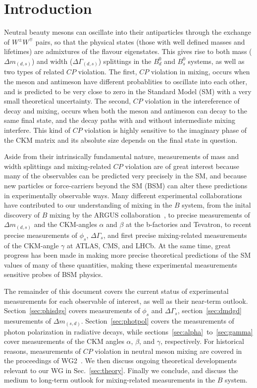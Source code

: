 \section{Introduction}
Neutral beauty mesons can oscillate into their antiparticles through the exchange of $W^\pm W^\mp$ pairs, so that the 
physical states (those with well defined masses and lifetimes) are admixtures of the flavour eigenstates. This gives
rise to both mass ($\Delta m_{(d,s)}$) and width ($\Delta\Gamma_{(d,s)}$) splittings in the $B^0_d$ and $B^0_s$ systems, as well
as two types of related $CP$ violation. The first, $CP$ violation in mixing, occurs when the meson and antimeson have different
probablities to oscillate into each other, and is predicted to be very close to zero in the Standard Model (SM) with a very
small theoretical uncertainty. The second, $CP$ violation in the intereference of decay and mixing, occurs when both the meson
and antimeson can decay to the same final state, and the decay paths with and without intermediate mixing interfere. This kind of $CP$
violation is highly sensitive to the imaginary phase of the CKM matrix and its absolute size depends on the final state in question.

Aside from their intrinsically fundamental nature, measurements of mass and width splittings and mixing-related $CP$ violation are
of great interest because many of the observables can be predicted very precisely in the SM, and because new particles or force-carriers
beyond the SM (BSM) can alter these predictions in experimentally observable ways. Many different experimental collaborations have contributed
to our understanding of mixing in the $B$ system, from the inital discovery of $B$ mixing by the ARGUS collaboration~\cite{Prentice:1987ap}, to precise measurements
of $\Delta m_{(d,s)}$ and the CKM-angles $\alpha$ and $\beta$ at the b-factories and Tevatron, to recent precise measurements
of $\phi_s$, $\Delta\Gamma_s$, and first precise mixing-related measurements of the CKM-angle $\gamma$ at ATLAS, CMS, and LHCb. At the same
time, great progress has been made in making more precise theoretical predictions of the SM values of many of these quantities, making
these experimental measurements sensitive probes of BSM physics.

The remainder of this document covers the current status of experimental measurements for each observable of
interest, as well as their near-term outlook. Section~\ref{sec:phisdgs} covers measurements of $\phi_s$ and $\Delta\Gamma_s$, section~\ref{sec:dmdgd} 
mesurements of $\Delta m_{(s,d)}$. Section~\ref{sec:photpol} covers the measurements of photon polarization in radiative decays, while
sections~\ref{sec:alpha}~to~\ref{sec:gamma} cover measurements of the CKM angles $\alpha$, $\beta$, and $\gamma$, respectively.
For historical reasons, measurements of $CP$ violation in neutral meson mixing are covered in the proceedings of WG2~\cite{WG2PROC}. We then discuss
ongoing theoretical developments relevant to our WG in Sec.~\ref{sec:theory}. Finally we conclude,
and discuss the medium to long-term outlook for mixing-related measurements in the $B$ system.


